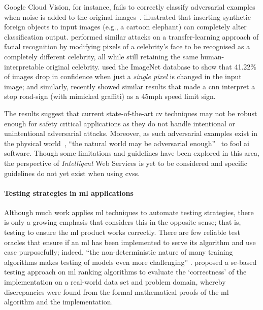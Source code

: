 Google Cloud Vision, for instance, fails to correctly classify adversarial examples when noise is added to the original images~\citep{Hosseini:2018jr}. \citet{Rosenfeld:2018ut} illustrated that inserting synthetic foreign objects to input images (e.g., a cartoon elephant) can completely alter classification output. \citet{Wang:2018vl} performed similar attacks on a transfer-learning approach of facial recognition by modifying pixels of a celebrity's face to be recognised as a completely different celebrity, all while still retaining the same human-interpretable original celebrity. \citet{Su:2017uw} used the ImageNet database to show that 41.22\% of images drop in confidence when just a \textit{single pixel} is changed in the input image; and similarly, \citet{Eykholt:2018vka} recently showed similar results that made a \gls{cnn} interpret a stop road-sign (with mimicked graffiti) as a 45mph speed limit sign.

The results suggest that current state-of-the-art \gls{cv} techniques may not be robust enough for safety critical applications as they do not handle intentional or unintentional adversarial attacks. Moreover, as such adversarial examples exist in the physical world~\citep{Kurakin:2016vw,Eykholt:2018vk}, ``the natural world may be adversarial enough''~\citep{Pezzementi:2018tq} to fool \gls{ai} software. Though some limitations and guidelines have been explored in this area, the perspective of \textit{Intelligent} Web Services is yet to be considered and specific guidelines do not yet exist when using \glspl{cvs}.

\paragraph{Testing strategies in \gls{ml} applications}

Although much work applies \gls{ml} techniques to automate testing strategies, there is only a growing emphasis that considers this in the opposite sense; that is, testing to ensure the \gls{ml} product works correctly. There are few reliable test oracles that ensure if an \gls{ml} has been implemented to serve its algorithm and use case purposefully; indeed, ``the non-deterministic nature of many training algorithms makes testing of models even more challenging'' \citep{Arpteg:2018ke}.
\citet{murphy2007approach} proposed a \gls{se}-based testing approach on \gls{ml} ranking algorithms to evaluate the `correctness' of the implementation on a real-world data set and problem domain, whereby discrepancies were found from the formal mathematical proofs of the \gls{ml} algorithm and the implementation. 

